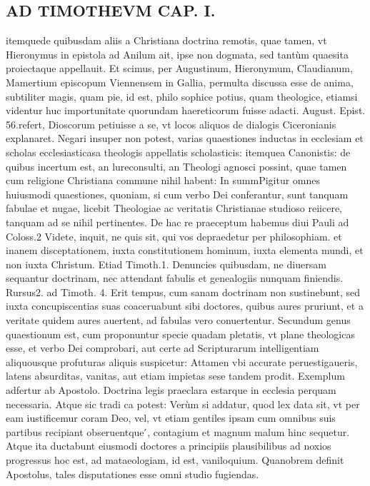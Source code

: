 \documentclass{article}
\begin{document}
\begin{pages}
\section*{AD TIMOTHEVM CAP. I. }
\marginpar{[ p.18 ]}\pstart itemquede quibusdam aliis a Christiana doctrina remotis, quae tamen, vt Hieronymus in epistola ad Anilum ait, ipse non dogmata, sed tantùm quaesita proiectaque  appellauit. Et scimus, per Augustinum, Hieronymum, Claudianum, Mamertium episcopum Viennensem in Gallia, permulta discussa esse de anima, subtiliter magis, quam pie, id est, philo sophice potius, quam theologice, etiamsi videntur huc importunitate quorundam haereticorum fuisse adacti. August. Epist. 56.refert, Dioscorum petiuisse a se, vt locos aliquos de dialogis Ciceronianis explanaret. Negari insuper non potest, varias quaestiones inductas in ecclesiam et scholas ecclesiasticasa theologis appellatis scholasticis: itemquea Canonistis: de quibus incertum est, an lureconsulti, an Theologi agnosci possint, quae tamen cum religione Christiana commune nihil habent: In summPigitur omnes huiusmodi quaestiones, quoniam, si cum verbo Dei conferantur, sunt tanquam fabulae et nugae, licebit Theologiae ac veritatis Christianae studioso reiicere, tanquam ad se nihil pertinentes. De hac re praeceptum habemus diui Pauli ad Coloss.2 Videte, inquit, ne quis sit, qui vos depraedetur per philosophiam. et inanem disceptationem, iuxta constitutionem hominum, iuxta elementa mundi, et non iuxta Christum.   Etiad Timoth.1. Denuncies quibusdam, ne diuersam sequantur doctrinam, nec attendant fabulis et genealogiis nunquam finiendis. Rursus2. ad Timoth. 4. Erit tempus, cum   sanam doctrinam non sustinebunt, sed iuxta concupiscentias suas coaceruabunt sibi doctores,   quibus aures pruriunt, et a veritate quidem aures auertent, ad fabulas vero conuertentur.    \pend\pstart Secundum genus quaestionum est, cum proponuntur specie quadam pletatis, vt plane theologicas esse, et verbo Dei comprobari, aut certe ad Scripturarum intelligentiam aliquousque  profuturas aliquis suspicetur: Attamen vbi accurate peruestigaueris, latens absurditas, vanitas, aut etiam impietas sese tandem prodit. Exemplum adfertur ab Apostolo. Doctrina legis praeclara estarque  in ecclesia perquam necessaria. Atque  sic tradi ca potest: Verùm si addatur, quod lex data sit, vt per eam iustificemur coram Deo, vel, vt etiam gentiles ipsam cum omnibus suis partibus recipiant obseruentque ́, contagium et magnum malum hinc sequetur. Atque  ita ductabunt eiusmodi doctores a principiis plausibilibus ad noxios progressus hoc est, ad mataeologiam, id est, vaniloquium. Quanobrem definit Apostolus, tales disputationes esse omni studio fugiendas.  \pend
{}
{}

\end{pages}
\end{document}
